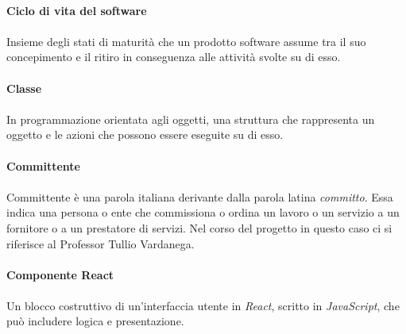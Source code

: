 \documentclass[10pt, a4paper]{article}
\begin{document}
\vspace{2em}
\paragraph{Ciclo di vita del software}\noindent\hrulefill\noindent\hrulefill
\paragraph{}Insieme degli stati di maturità che un prodotto software assume tra il suo concepimento e il ritiro in conseguenza alle
attività svolte su di esso.

\vspace{2em}
\paragraph{Classe}\noindent\hrulefill
\paragraph{}In programmazione orientata agli oggetti, una struttura che rappresenta un oggetto e le azioni che possono essere eseguite su di esso.




\vspace{2em}
\paragraph{Committente}\noindent\hrulefill
\paragraph{}Committente è una parola italiana derivante dalla parola latina \textit{committo}. Essa indica una persona o ente che commissiona o ordina un lavoro o un servizio a un fornitore o a un prestatore di
servizi. Nel corso del progetto in questo caso ci si riferisce al Professor Tullio Vardanega.

\vspace{2em}
\paragraph{Componente React}\noindent\hrulefill
\paragraph{}Un blocco costruttivo di un'interfaccia utente in \textit{React\pg}, scritto in \textit{JavaScript\pg}, che può includere logica e presentazione.
\end{document}
